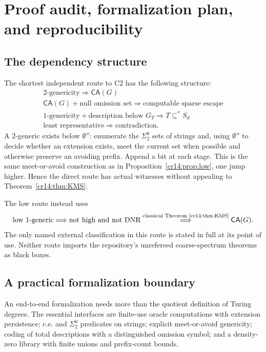 \documentclass[11pt,a4paper]{article}
\newcommand{\substar}{\subseteq^{*}}
\newcommand{\doublezero}{\emptyset''}
\newcommand{\CA}{\mathsf{CA}}
\theoremstyle{definition}
\theoremstyle{remark}
\begin{document}
\section{Proof audit, formalization plan, and reproducibility}
\label{cr14:sec:audit}
\subsection{The dependency structure}
The shortest independent route to C2 has the following structure:
\[
 \begin{array}{c}
  2\text{-genericity}\Longrightarrow\CA(G)\\
  \CA(G)+\text{null omission set}\Longrightarrow
                   \text{computable sparse escape}\\
  1\text{-genericity}+\text{description below }G_T
                  \Longrightarrow T\substar S_d\\
  \text{least representative}\Longrightarrow\text{contradiction}.
 \end{array}
\]
A $2$-generic exists below $\doublezero$: enumerate the $\Sigma^0_2$ sets
of strings and, using $\doublezero$ to decide whether an extension exists,
meet the current set when possible and otherwise preserve an avoiding
prefix. Append a bit at each stage. This is the same meet-or-avoid
construction as in Proposition~\ref{cr14:prop:low}, one jump higher.
Hence the direct route has actual witnesses without appealing to
Theorem~\ref{cr14:thm:KMS}.

The low route instead uses
\[
 \text{low $1$-generic}\Longrightarrow
 \text{not high and not DNR}
 \overset{\text{classical Theorem~\ref{cr14:thm:KMS}}}{\Longrightarrow}\CA(G).
\]
The only named external classification in this route is stated in full
at its point of use. Neither route imports the repository's unrefereed
coarse-spectrum theorems as black boxes.

\subsection{A practical formalization boundary}\label{cr14:sec:formal}
An end-to-end formalization needs more than the quotient definition of
Turing degrees. The essential interfaces are finite-use oracle
computations with extension persistence; c.e. and $\Sigma^0_2$ predicates
on strings; explicit meet-or-avoid genericity; coding of total descriptions
with a distinguished omission symbol; and a density-zero library with
finite unions and prefix-count bounds.
\end{document}
